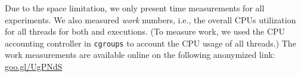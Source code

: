  Due to the space limitation, we only present  time measurements for all experiments. We also measured  {\em work} numbers, i.e., the overall CPUs utilization for all threads for both \pthreads and \projecttitle executions. (To measure work, we used the CPU accounting controller in {\tt cgroups} to account the CPU usage of all threads.) The work measurements are available online on the following anonymized link:  \href{https://goo.gl/UgPNdS}{goo.gl/UgPNdS}







%
%
%
%
%

